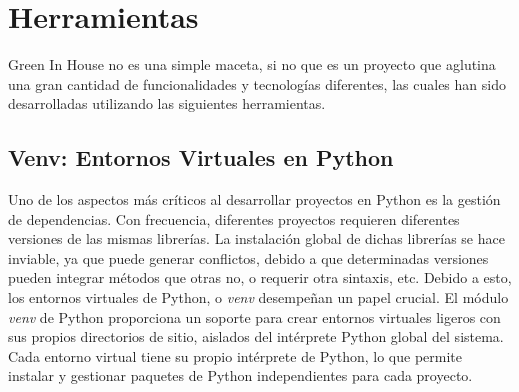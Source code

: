 \section{Herramientas}
Green In House no es una simple maceta, si no que es un proyecto que aglutina una gran cantidad de funcionalidades y tecnologías diferentes, las cuales han sido desarrolladas utilizando las siguientes herramientas.

    \subsection{Venv: Entornos Virtuales en Python}
    Uno de los aspectos más críticos al desarrollar proyectos en Python es la gestión de dependencias. Con frecuencia, diferentes proyectos requieren diferentes versiones de las mismas librerías. La instalación global de dichas librerías se hace inviable, ya que puede generar conflictos, debido a que determinadas versiones pueden integrar métodos que otras no, o requerir otra sintaxis, etc. Debido a esto, los entornos virtuales de Python, o \textit{venv} desempeñan un papel crucial. \cite{wiki:venv}
    El módulo \textit{venv} de Python proporciona un soporte para crear entornos virtuales ligeros con sus propios directorios de sitio, aislados del intérprete Python global del sistema. Cada entorno virtual tiene su propio intérprete de Python, lo que permite instalar y gestionar paquetes de Python independientes para cada proyecto.

